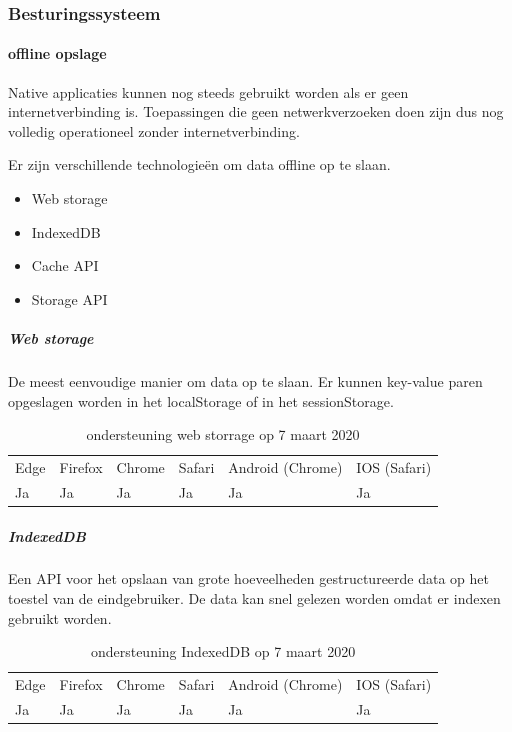 \subsubsection{Besturingssysteem}
\paragraph{offline opslage}
Native applicaties kunnen nog steeds gebruikt worden als er geen internetverbinding is. Toepassingen die geen netwerkverzoeken doen zijn dus nog volledig operationeel zonder internetverbinding. 

Er zijn verschillende technologieën om data offline op te slaan. 

 \begin{itemize}
	\item	Web storage
	\item	IndexedDB
	\item	Cache API
	\item	Storage API
\end{itemize}

	\subparagraph{Web storage}
	De meest eenvoudige manier om data op te slaan. Er kunnen key-value paren opgeslagen worden in het localStorage of in het sessionStorage. 
	\autocite{Hickson2016}
	
	\begin{table}[H]
		\centering
		\begin{tabular}{llllll}
			Edge & Firefox & Chrome & Safari & Android (Chrome) & IOS (Safari) \\
			Ja   & Ja      &  Ja     & Ja     & Ja               & Ja          
		\end{tabular}	
		\caption{ondersteuning web storrage op 7 maart 2020}
	\end{table}
	
	
	
	\subparagraph{IndexedDB}
	Een API voor het opslaan van grote hoeveelheden gestructureerde data op het toestel van de eindgebruiker. De data kan snel gelezen worden omdat er indexen gebruikt worden. 
	\autocite{Alabbas2018}
	
	\begin{table}[H]
		\centering
			\begin{tabular}{llllll}
				Edge & Firefox & Chrome & Safari & Android (Chrome) & IOS (Safari) \\
				Ja   & Ja      &  Ja     & Ja     & Ja               & Ja          
			\end{tabular}	
			\caption{ondersteuning IndexedDB op 7 maart 2020}
	\end{table}
	
